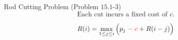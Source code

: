 \begin{frame}{}
  \begin{exampleblock}{Rod Cutting Problem (Problem $15.1$-$3$)}
    \[
      \text{Each cut incurs a fixed cost of } c.
    \]
  \end{exampleblock}

  \pause
  \[
    R(i) = \max_{1 \le j \le i} \Big(p_j \;\textcolor{red}{ -\; c} + R(i-j)\Big)
  \]
\end{frame}

% 

% 
% 
